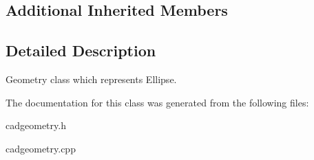 \subsection*{Additional Inherited Members}


\subsection{Detailed Description}
Geometry class which represents Ellipse. 

The documentation for this class was generated from the following files\+:\begin{DoxyCompactItemize}
\item 
cadgeometry.\+h\item 
cadgeometry.\+cpp\end{DoxyCompactItemize}
